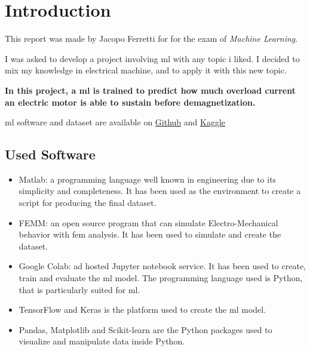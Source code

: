 \documentclass[12pt,hidelinks]{article}
\numberwithin{equation}{section}
\numberwithin{figure}{section}
\numberwithin{table}{section}
\begin{document}
\clearpage
\thispagestyle{empty}

\newpage


\tableofcontents

\clearpage


\newpage
\section{Introduction}
This report was made by Jacopo Ferretti for for the exam of \emph{Machine Learning}.

I was asked to develop a project involving \gls{ml} with any topic i liked. I decided to mix my knowledge in electrical machine, and to apply it with this new topic.

\textbf{In this project, a \gls{ml} is trained to predict how much overload current an electric motor is able to sustain before demagnetization.}

\gls{ml} software and dataset are available on \href{http://www.overleaf.com}{Github}\cite{Github} and \href{http://www.overleaf.com}{Kaggle}\cite{Kaggle}

\subsection{Used Software}
\begin{itemize}
  \item Matlab\cite{matlab}: a programming language well known in engineering due to its simplicity and completeness. It has been used as the environment to create a script for producing the final dataset.
  \item FEMM\cite{femm}: an open source program that can simulate Electro-Mechanical behavior with \gls{fem} analysis. It has been used to simulate and create the dataset.
  \item Google Colab\cite{colab}: ad hosted Jupyter notebook service. It has been used to create, train and evaluate the \gls{ml} model. The programming language used is Python\cite{python}, that is particularly suited for \gls{ml}.
  \item TensorFlow\cite{tensorflow} and Keras\cite{keras} is the platform used to create the \gls{ml} model.
  \item Pandas\cite{pandas}, Matplotlib\cite{matplotlib} and Scikit-learn\cite{sklearn} are the Python packages used to visualize and manipulate data inside Python.
\end{itemize}
\end{document}
